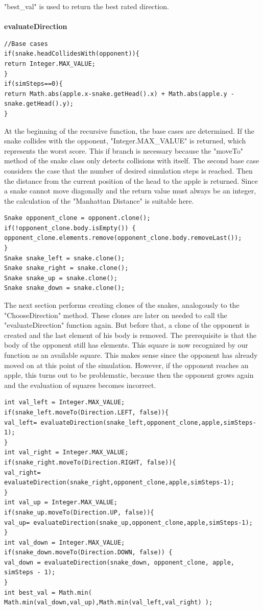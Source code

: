 \documentclass[a4paper,12pt]{article}
\begin{document}
"best\_val" is used to return the best rated direction.
\\
\\\textbf{evaluateDirection}
\begin{verbatim}
//Base cases
if(snake.headCollidesWith(opponent)){
return Integer.MAX_VALUE;
}
if(simSteps==0){
return Math.abs(apple.x-snake.getHead().x) + Math.abs(apple.y - snake.getHead().y);
}
\end{verbatim}
At the beginning of the recursive function, the base cases are determined. If the snake collides with
the opponent, "Integer.MAX\_VALUE" is returned, which represents the worst score. This if branch is
necessary because the "moveTo" method of the snake class only detects collisions with itself.
The second base case considers the case that the number of desired simulation steps is reached.
Then the distance from the current position of the head to the apple is returned. Since a snake
cannot move diagonally and the return value must always be an integer, the calculation of the
"Manhattan Distance" is suitable here.\cite{manhatten}
\begin{verbatim}
Snake opponent_clone = opponent.clone();
if(!opponent_clone.body.isEmpty()) {
opponent_clone.elements.remove(opponent_clone.body.removeLast());
}
Snake snake_left = snake.clone();
Snake snake_right = snake.clone();
Snake snake_up = snake.clone();
Snake snake_down = snake.clone();
\end{verbatim}
The next section performs creating clones of the snakes, analogously to the "ChooseDirection"
method. These clones are later on needed to call the "evaluateDirection" function again. But before
that, a clone of the opponent is created and the last element of his body is removed. The prerequisite
is that the body of the opponent still has elements. This square is now recognized by our function as
an available square. This makes sense since the opponent has already moved on at this point of the
simulation. However, if the opponent reaches an apple, this turns out to be problematic, because
then the opponent grows again and the evaluation of squares becomes incorrect.
\begin{verbatim}
int val_left = Integer.MAX_VALUE;
if(snake_left.moveTo(Direction.LEFT, false)){
val_left= evaluateDirection(snake_left,opponent_clone,apple,simSteps-1);
}
int val_right = Integer.MAX_VALUE;
if(snake_right.moveTo(Direction.RIGHT, false)){
val_right= evaluateDirection(snake_right,opponent_clone,apple,simSteps-1);
}
int val_up = Integer.MAX_VALUE;
if(snake_up.moveTo(Direction.UP, false)){
val_up= evaluateDirection(snake_up,opponent_clone,apple,simSteps-1);
}
int val_down = Integer.MAX_VALUE;
if(snake_down.moveTo(Direction.DOWN, false)) {
val_down = evaluateDirection(snake_down, opponent_clone, apple, simSteps - 1);
}
int best_val = Math.min( Math.min(val_down,val_up),Math.min(val_left,val_right) );
\end{verbatim}
\end{document}
